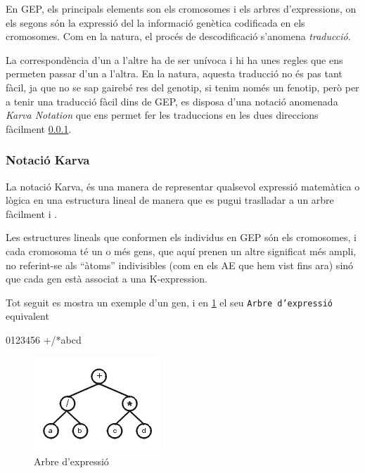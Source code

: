 En GEP, els principals elements son els cromosomes i els arbres d'expressions,
on els segons són la expressió del la informació genètica codificada en els
cromosomes.  Com en la natura, el procés de descodificació s'anomena
\emph{traducció}.

La correspondència d'un a l'altre ha de ser unívoca i hi ha unes regles que ens
permeten passar d'un a l'altra.  En la natura, aquesta traducció no és pas tant
fàcil, ja que no se sap gairebé res del genotip, si tenim només un fenotip, però
per a tenir una traducció fàcil dins de GEP, es disposa d'una notació anomenada
\emph{Karva Notation} que ens permet fer les traduccions en les dues direccions
fàcilment \ref{ssub:Notacio Karva}.



\subsubsection{Notació Karva} %
\label{ssub:Notacio Karva}

La notació Karva, és una manera de representar qualsevol expressió matemàtica o
lògica en una estructura lineal de manera que es pugui traslladar a un arbre
fàcilment \cite{ferreira:2001} i \cite{ferreira:2006}.

Les estructures lineals que conformen els individus en GEP són els cromosomes,
i cada cromosoma té un o més gens, que aquí prenen un altre significat més
ampli, no referint-se als ``àtoms'' indivisibles (com en els AE que hem vist
fins ara) sinó que cada gen està associat a una K-expression.
\cite{ferreira:2007}

Tot seguit es mostra un exemple d'un gen, i en \ref{fig:expression tree1} el seu
\texttt{Arbre d'expressió} equivalent

\begin{center}
0123456    
+/*abcd
\end{center}

\begin{figure}[h]
\begin{center}
\includegraphics{intro/et1.png}
\end{center}
\caption{Arbre d'expressió}
\label{fig:expression tree1}
\end{figure}

